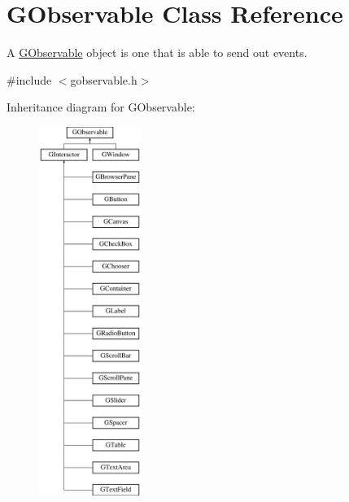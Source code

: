 \hypertarget{classsgl_1_1GObservable}{}\section{G\+Observable Class Reference}
\label{classsgl_1_1GObservable}


A \mbox{\hyperlink{classsgl_1_1GObservable}{G\+Observable}} object is one that is able to send out events.  




{\ttfamily \#include $<$gobservable.\+h$>$}

Inheritance diagram for G\+Observable\+:\begin{figure}[H]
\begin{center}
\leavevmode
\includegraphics[height=12.000000cm]{classsgl_1_1GObservable}
\end{center}
\end{figure}
